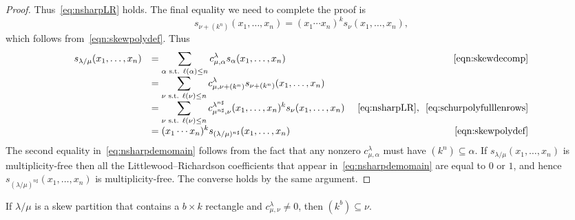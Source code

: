 \documentclass[ALCO,ThmDefs,Unicode,epreuves]{cedram}
\newcommand{\nsharp}{n\sharp}%
\begin{document}
\begin{proof}
Thus~\eqref{eq:nsharpLR} holds. The final equality we need to complete the proof is
\begin{equation}
\label{eq:schurpolyfulllenrows}
s_{\nu + (k^n)}(x_1,\ldots,x_n) = (x_1 \cdots x_n)^k s_{\nu}(x_1,\ldots,x_n),
\end{equation}
which follows from~\eqref{eqn:skewpolydef}. Thus
\begin{equation}
\begin{array}{rlr}
\label{eq:nsharpdemomain}
s_{\lambda / \mu}(x_1,\ldots,x_n) & = \displaystyle \sum_{\alpha \text{ s.t. }\ell(\alpha) \leq n} c_{\mu, \alpha}^{\lambda} s_{\alpha}(x_1,\ldots,x_n) &~\eqref{eqn:skewdecomp}\\
& = \displaystyle \sum_{\nu\text{ s.t. }\ell(\nu) \leq n} c_{\mu, \nu + (k^n)}^{\lambda} s_{\nu + (k^n)}(x_1,\ldots,x_n) & \\
& = \displaystyle \sum_{\nu\text{ s.t. }\ell(\nu) \leq n} c_{\mu^{n\sharp}, \nu}^{\lambda^{n\sharp}} (x_1,\ldots,x_n)^k s_{\nu}(x_1,\ldots,x_n) &~\eqref{eq:nsharpLR}\text{, }~\eqref{eq:schurpolyfulllenrows}\\
& = \displaystyle (x_1 \cdots x_n)^k s_{(\lambda / \mu)^{\nsharp }}(x_1,\ldots,x_n) &~\eqref{eqn:skewpolydef}\\
\end{array}
\end{equation}
The second equality in~\eqref{eq:nsharpdemomain} follows from the fact that any nonzero $c_{\mu, \alpha}^{\lambda}$ must have $(k^n) \subseteq \alpha$. If $s_{\lambda / \mu}(x_1,\ldots,x_n)$ is multiplicity-free then all the Littlewood--Richardson coefficients that appear in~\eqref{eq:nsharpdemomain} are equal to $0$ or $1$, and hence $s_{(\lambda / \mu)^{\nsharp }}(x_1,\ldots,x_n)$ is multiplicity-free. The converse holds by the same argument.
\end{proof}
\begin{lemma}
\label{lemma:rectanglecontent}
If $\lambda / \mu$ is a skew partition that contains a $b \times k$ rectangle and $c_{\mu, \nu}^{\lambda} \neq 0$, then $(k^b) \subseteq \nu$.
\end{lemma}
\end{document}
